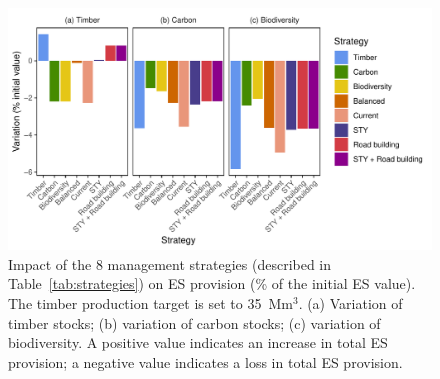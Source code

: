 \documentclass{article}
\begin{document}
\begin{figure}
    \centering
    \includegraphics[width=\linewidth]{graphs/costsScenario}
    \caption{Impact of the 8 management strategies (described in Table~\ref{tab:strategies}) on ES provision (\% of the initial ES value). The timber production target is set to 35~Mm$^3$. (a) Variation of timber stocks; (b) variation of carbon stocks; (c) variation of biodiversity. A positive value indicates an increase in total ES provision; a negative value indicates a loss in total ES provision.}
    \label{fig:scenESProv}
\end{figure}
\end{document}
